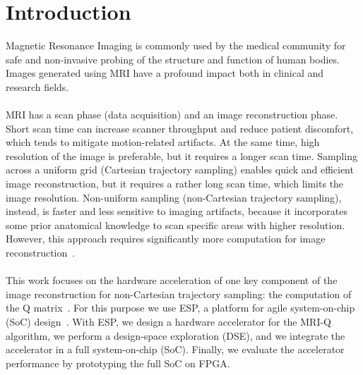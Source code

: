 \section{Introduction}
\label{sec:intro}

Magnetic Resonance Imaging is commonly used by the medical community for safe
and non-invasive probing of the structure and function of human bodies. Images
generated using MRI have a profound impact both in clinical and research
fields.\\
\\
MRI has a scan phase (data acquisition) and an image reconstruction phase. Short
scan time can increase scanner throughput and reduce patient discomfort, which
tends to mitigate motion-related artifacts. At the same time, high resolution of
the image is preferable, but it requires a longer scan time.
%
Sampling across a uniform grid (Cartesian trajectory sampling) enables quick and
efficient image reconstruction, but it requires a rather long scan time, which
limits the image resolution. Non-uniform sampling (non-Cartesian trajectory
sampling), instead, is faster and less sensitive to imaging artifacts, because
it incorporates some prior anatomical knowledge to scan specific areas with
higher resolution. However, this approach requires significantly more
computation for image reconstruction~\cite{stone2008accelerating}.\\
\\
This work focuses on the hardware acceleration of one key component of the image
reconstruction for non-Cartesian trajectory sampling: the computation of the Q
matrix~\cite{stratton2012parboil}. For this purpose we use ESP, a platform for
agile system-on-chip (SoC) design~\cite{esp-website, esp-release}. With ESP, we
design a hardware accelerator for the MRI-Q algorithm, we perform a design-space
exploration (DSE), and we integrate the accelerator in a full system-on-chip
(SoC). Finally, we evaluate the accelerator performance by prototyping the full
SoC on FPGA.
